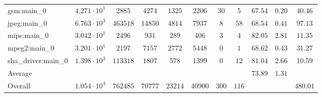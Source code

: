 \begin{tabular}{|l|c|c|c|c|c|c|c|c|c|c|}
gsm:main\_0             & $ 4.271 \cdot 10^{1} $ & $ 2885   $ & $ 4274  $ & $ 1325  $ & $ 2206  $ & $ 30  $ & $ 5   $ & $ 67.54       $ & $ 0.20    $ & $ 40.46   $ \\
jpeg:main\_0            & $ 6.763 \cdot 10^{3} $ & $ 463518 $ & $ 14850 $ & $ 4814  $ & $ 7937  $ & $ 8   $ & $ 58  $ & $ 68.54       $ & $ 0.41    $ & $ 97.13   $ \\
mips:main\_0            & $ 3.042 \cdot 10^{1} $ & $ 2496   $ & $ 931   $ & $ 289   $ & $ 406   $ & $ 3   $ & $ 4   $ & $ 82.05       $ & $ 2.81    $ & $ 11.35   $ \\
mpeg2:main\_0           & $ 3.201 \cdot 10^{1} $ & $ 2197   $ & $ 7157  $ & $ 2772  $ & $ 5448  $ & $ 0   $ & $ 1   $ & $ 68.62       $ & $ 0.43    $ & $ 31.27   $ \\
sha\_driver:main\_0     & $ 1.398 \cdot 10^{3} $ & $ 113318 $ & $ 1807  $ & $ 578   $ & $ 1399  $ & $ 0   $ & $ 12  $ & $ 81.04       $ & $ 2.66    $ & $ 10.59   $ \\
\hline
Average                 & $                    $ & $        $ & $       $ & $       $ & $       $ & $     $ & $     $ & $ 73.89       $ & $ 1.31    $ & $         $ \\
\hline
Overall                 & $ 1.054 \cdot 10^{4} $ & $ 762485 $ & $ 70777 $ & $ 23214 $ & $ 40900 $ & $ 300 $ & $ 116 $ & $             $ & $         $ & $ 480.01  $ \\
\hline
\end{tabular}

